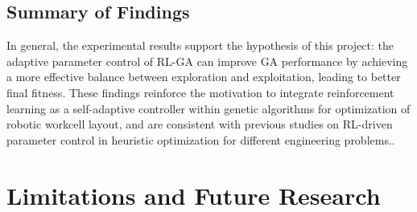 \documentclass{article}
\begin{document}




\subsection{Summary of Findings}
In general, the experimental results support the hypothesis of this project: the adaptive parameter control of RL-GA can improve GA performance by achieving a more effective balance between exploration and exploitation, leading to better final fitness. These findings reinforce the motivation to integrate reinforcement learning as a self-adaptive controller within genetic algorithms for optimization of robotic workcell layout, and are consistent with previous studies on RL-driven parameter control in heuristic optimization for different engineering problems.\parencite{huynh2021qlde,quevedo2021gecco,chaves2021brkgaql}.

\newpage
\section{Limitations and Future Research}
\end{document}
